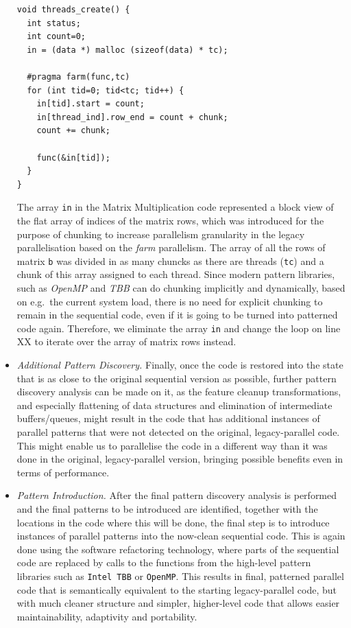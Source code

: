 \begin{itemize}
\begin{lstlisting}
void threads_create() {
  int status;
  int count=0;
  in = (data *) malloc (sizeof(data) * tc);

  #pragma farm(func,tc)   
  for (int tid=0; tid<tc; tid++) {  
    in[tid].start = count;
    in[thread_ind].row_end = count + chunk;
    count += chunk;

    func(&in[tid]);
  }
}
\end{lstlisting}
The array \lstinline{in} in the Matrix Multiplication code represented a block view of the flat array of indices of the matrix rows, which was introduced for the purpose of chunking to increase parallelism granularity in the legacy parallelisation based on the \emph{farm} parallelism. The array of all the rows of matrix \lstinline{b} was divided in as many chuncks as there are threads (\lstinline{tc}) and a chunk of this array assigned to each thread. Since modern pattern libraries, such as \emph{OpenMP} and \emph{TBB} can do chunking implicitly and dynamically, based on e.g.~the current system load, there is no need for explicit chunking to remain in the sequential code, even if it is going to be turned into patterned code again. Therefore, we eliminate the array \lstinline{in} and change the loop on line XX to iterate over the array of matrix rows instead.  
  
\item \emph{Additional Pattern Discovery.} Finally, once the code is restored into the state that is as close to the original sequential version as possible, further pattern discovery analysis can be made on it, as the feature cleanup transformations, and especially flattening of data structures and elimination of intermediate buffers/queues, might result in the code that has additional instances of parallel patterns that were not detected on the original, legacy-parallel code. This might enable us to parallelise the code in a different way than it was done in the original, legacy-parallel version, bringing possible benefits even in terms of performance.

\item \emph{Pattern Introduction.} After the final pattern discovery analysis is performed and the final patterns to be introduced are identified, together with the locations in the code where this will be done, the final step is to introduce instances of parallel patterns into the now-clean sequential code. This is again done using the software refactoring technology, where parts of the sequential code are replaced by calls to the functions from the high-level pattern libraries such as \lstinline{Intel TBB} or \lstinline{OpenMP}. This results in final, patterned parallel code that is semantically equivalent to the starting legacy-parallel code, but with much cleaner structure and simpler, higher-level code that allows easier maintainability, adaptivity and portability.
\end{itemize}

